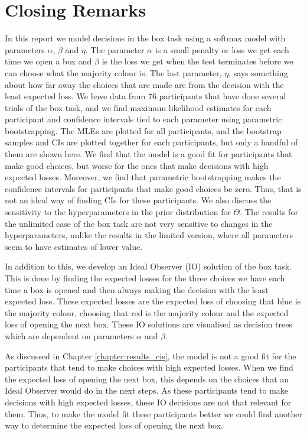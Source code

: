 \chapter{Closing Remarks}
In this report we model decisions in the box task using a softmax model with parameters $\alpha$, $\beta$ and $\eta$. The parameter $\alpha$ is a small penalty or loss we get each time we open a box and $\beta$ is the loss we get when the test terminates before we can choose what the majority colour is. The last parameter, $\eta$, says something about how far away the choices that are made are from the decision with the least expected loss.
We have data from 76 participants that have done several trials of the box task, and we find maximum likelihood estimates for each participant and confidence intervals tied to each parameter using parametric bootstrapping. The MLEs are plotted for all participants, and the bootstrap samples and CIs are plotted together for each participants, but only a handful of them are shown here. 
We find that the model is a good fit for participants that make good choices, but worse for the ones that make decisions with high expected losses. Moreover, we find that parametric bootstrapping makes the confidence intervals for participants that make good choices be zero. Thus, that is not an ideal way of finding CIs for these participants.
We also discuss the sensitivity to the hyperparameters in the prior distribution for $\Theta$. The results for the unlimited case of the box task are not very sensitive to changes in the hyperparameters, unlike the results in the limited version, where all parameters seem to have estimates of lower value. 

In addition to this, we develop an Ideal Observer (IO) solution of the box task. This is done by finding the expected losses for the three choices we have each time a box is opened and then always making the decision with the least expected loss. These expected losses are the expected loss of choosing that blue is the majority colour, choosing that red is the majority colour and the expected loss of opening the next box. These IO solutions are visualised as decision trees which are dependent on parameters $\alpha$ and $\beta$.

As discussed in Chapter \ref{chapter:results_cis}, the model is not a good fit for the participants that tend to make choices with high expected losses. When we find the expected loss of opening the next box, this depends on the choices that an Ideal Observer would do in the next steps. As these participants tend to make decisions with high expected losses, these IO decisions are not that relevant for them. Thus, to make the model fit these participants better we could find another way to determine the expected loss of opening the next box. 

